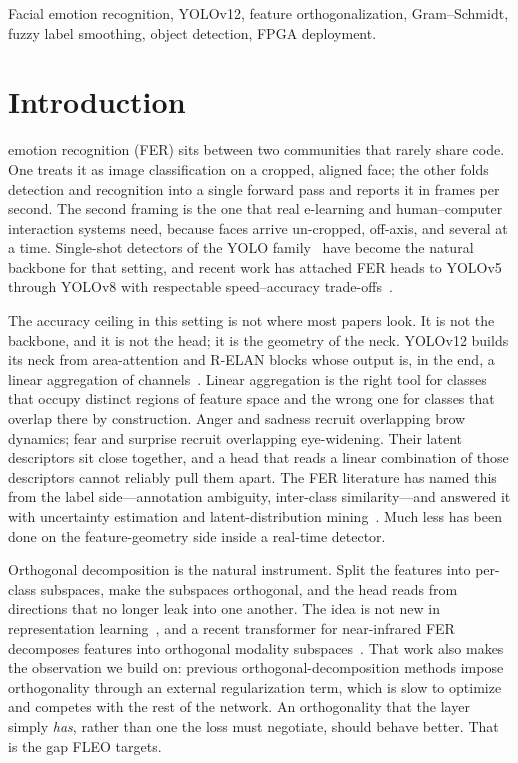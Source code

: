 \documentclass[journal]{IEEEtran}
\begin{document}
\begin{IEEEkeywords}
Facial emotion recognition, YOLOv12, feature orthogonalization,
Gram--Schmidt, fuzzy label smoothing, object detection, FPGA deployment.
\end{IEEEkeywords}

\section{Introduction}
 emotion recognition (FER) sits between two communities
that rarely share code. One treats it as image classification on a cropped,
aligned face; the other folds detection and recognition into a single forward
pass and reports it in frames per second. The second framing is the one that
real e-learning and human--computer interaction systems need, because faces
arrive un-cropped, off-axis, and several at a time. Single-shot detectors of
the YOLO family~\cite{redmon2016yolo,khanam2024yolov11,tian2025yolov12} have
become the natural backbone for that setting, and recent work has attached FER
heads to YOLOv5 through YOLOv8 with respectable speed--accuracy
trade-offs~\cite{alshammari2024yolov8fer,ma2025alfyolo,ma2024feryolomamba}.

The accuracy ceiling in this setting is not where most papers look. It is not
the backbone, and it is not the head; it is the geometry of the neck. YOLOv12
builds its neck from area-attention and R-ELAN blocks whose output is, in the
end, a linear aggregation of channels~\cite{tian2025yolov12}. Linear
aggregation is the right tool for classes that occupy distinct regions of
feature space and the wrong one for classes that overlap there by
construction. Anger and sadness recruit overlapping brow dynamics; fear and
surprise recruit overlapping eye-widening. Their latent descriptors sit close
together, and a head that reads a linear combination of those descriptors
cannot reliably pull them apart. The FER literature has named this from the
label side---annotation ambiguity, inter-class similarity---and answered it
with uncertainty estimation and latent-distribution
mining~\cite{wang2020scn,she2021dmue,zhang2021rul,navigating2025}. Much less
has been done on the feature-geometry side inside a real-time detector.

Orthogonal decomposition is the natural instrument. Split the features into
per-class subspaces, make the subspaces orthogonal, and the head reads from
directions that no longer leak into one another. The idea is not new in
representation learning~\cite{bansal2018orthogonality,brock2019biggan,huang2018own},
and a recent transformer for near-infrared FER decomposes features into
orthogonal modality subspaces~\cite{nir2024hypergraph}. That work also makes
the observation we build on: previous orthogonal-decomposition methods impose
orthogonality through an external regularization term, which is slow to
optimize and competes with the rest of the network. An orthogonality that the
layer simply \emph{has}, rather than one the loss must negotiate, should behave
better. That is the gap FLEO targets.
\end{document}
